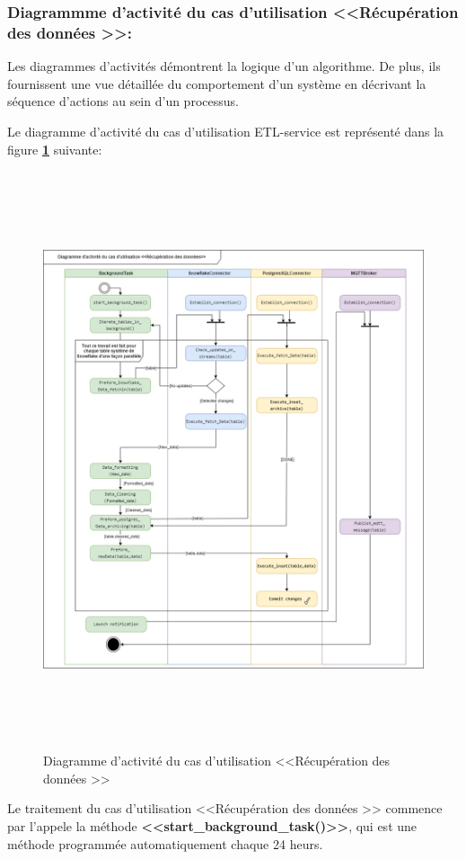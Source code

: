 \subsubsection{Diagrammme d'activité du cas d'utilisation <<Récupération des données >>:}
\par Les diagrammes d'activités démontrent la logique d'un algorithme. De plus, ils fournissent une vue détaillée du comportement d'un système en décrivant la séquence d'actions au sein d'un processus\cite{diag_act}.
\par Le diagramme d'activité du cas d'utilisation ETL-service est représenté dans la figure \textbf{\ref{fig:act}} suivante:
    \begin{figure}[H]
        \centering
        \includegraphics[width=1\linewidth, height=17cm]{img/conception/diag_act_1.png}
        \caption{Diagramme d'activité du cas d'utilisation <<Récupération des données >>}
            \label{fig:act}
        \end{figure}
\par Le traitement du cas d'utilisation <<Récupération des données >> commence par l'appele la méthode \textbf{<<start\_background\_task()>>}, qui est une méthode programmée automatiquement chaque 24 heurs.
